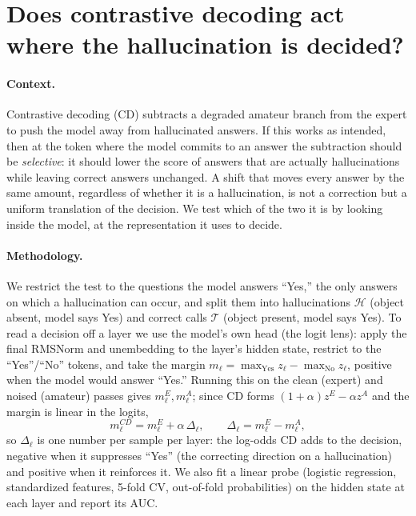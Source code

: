 \documentclass[11pt]{article}
\begin{document}
\section{Does contrastive decoding act where the hallucination is decided?}

\paragraph{Context.}
Contrastive decoding (CD) subtracts a degraded amateur branch from the expert to
push the model away from hallucinated answers. If this works as intended, then at
the token where the model commits to an answer the subtraction should be
\emph{selective}: it should lower the score of answers that are actually
hallucinations while leaving correct answers unchanged. A shift that moves every
answer by the same amount, regardless of whether it is a hallucination, is not a
correction but a uniform translation of the decision. We test which of the two it
is by looking inside the model, at the representation it uses to decide.

\paragraph{Methodology.}
We restrict the test to the questions the model answers ``Yes,'' the only answers on
which a hallucination can occur, and split them into hallucinations $\mathcal{H}$
(object absent, model says Yes) and correct calls $\mathcal{T}$ (object present,
model says Yes). To read a decision off a layer we use the model's own head (the
logit lens): apply the final RMSNorm and unembedding to the layer's hidden state,
restrict to the ``Yes''/``No'' tokens, and take the margin
$m_\ell=\max_{\text{Yes}}z_\ell-\max_{\text{No}}z_\ell$, positive when the model would
answer ``Yes.'' Running this on the clean (expert) and noised (amateur) passes gives
$m^{E}_\ell,m^{A}_\ell$; since CD forms $(1+\alpha)z^{E}-\alpha z^{A}$ and the margin
is linear in the logits,
\begin{equation}
m^{CD}_\ell = m^{E}_\ell + \alpha\,\Delta_\ell,\qquad \Delta_\ell = m^{E}_\ell - m^{A}_\ell,
\end{equation}
so $\Delta_\ell$ is one number per sample per layer: the log-odds CD adds to the
decision, negative when it suppresses ``Yes'' (the correcting direction on a
hallucination) and positive when it reinforces it. We also fit a linear probe
(logistic regression, standardized features, 5-fold CV, out-of-fold probabilities)
on the hidden state at each layer and report its AUC.
\end{document}
